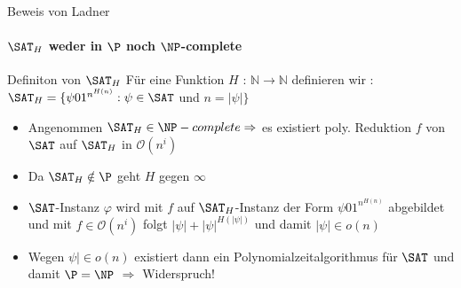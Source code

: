 \begin{frame}{Beweis von Ladner}
		\framesubtitle{${\SAT}_H$ weder in $\P$ noch $\NP$-complete}
	
		\begin{KITinfoblock}{Definiton von ${\SAT}_H$}
			Für eine Funktion $H$ : $\mathbb{N} \rightarrow \mathbb{N}$ definieren wir : \newline 	
			${\SAT}_H = \lbrace \psi 01^{n^{H(n)}} : \psi \in \SAT$ und $ n = |\psi| \rbrace$
		\end{KITinfoblock}
		
		
		\bigskip
		
		\bigskip
		\pause
		\begin{itemize}[<+->]
		\item Angenommen ${\SAT}_H \in \NP-complete \Rightarrow $ es existiert poly. Reduktion $f$ von $\SAT$ auf ${\SAT}_H$ in $\mathcal{O}(n^i)$
		\item Da ${\SAT}_H \notin \P $ geht $H$ gegen $\infty$ 
		\item $\SAT$-Instanz $\varphi$ wird mit $f$ auf ${\SAT}_H$-Instanz der Form $\psi01^{n^{H(n)}}$ abgebildet und mit $ f \in \mathcal{O}(n^i)$ folgt \newline
		$|\psi| + {|\psi|}^{H(|\psi|)}$ und damit $|\psi| \in o(n)$
		\item Wegen $\psi| \in o(n)$ existiert dann ein Polynomialzeitalgorithmus für $\SAT$ und damit $\P = \NP$  $\Rightarrow$ Widerspruch! 
		
		\end{itemize}
\end{frame}